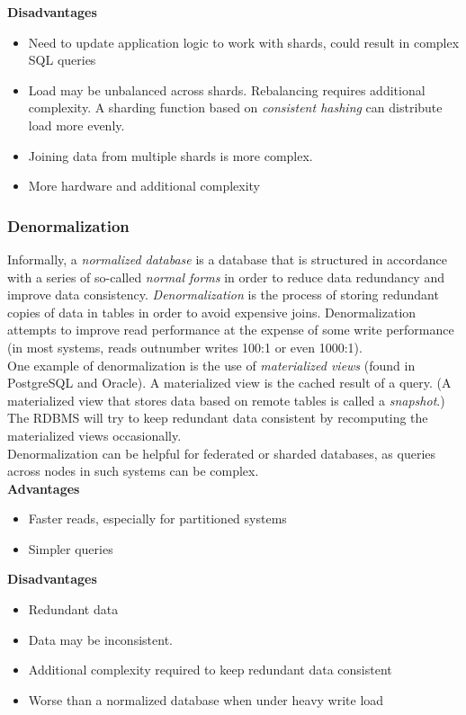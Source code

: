 \documentclass[12pt, titlepage]{article}
\begin{document}
\textbf{Disadvantages}
\begin{itemize}
  \item Need to update application logic to work with shards, could result in complex SQL queries
  \item Load may be unbalanced across shards. Rebalancing requires additional complexity. A sharding function based on \textit{consistent hashing} can distribute load more evenly.
  \item Joining data from multiple shards is more complex.
  \item More hardware and additional complexity
\end{itemize}

\subsubsection{Denormalization}

Informally, a \textit{normalized database} is a database that is structured in accordance with a series of so-called \textit{normal forms} in order to reduce data redundancy and improve data consistency. \textit{Denormalization} is the process of storing redundant copies of data in tables in order to avoid expensive joins. Denormalization attempts to improve read performance at the expense of some write performance (in most systems, reads outnumber writes 100:1 or even 1000:1). \\

One example of denormalization is the use of \textit{materialized views} (found in PostgreSQL and Oracle). A materialized view is the cached result of a query. (A materialized view that stores data based on remote tables is called a \textit{snapshot}.) The RDBMS will try to keep redundant data consistent by recomputing the materialized views occasionally. \\

Denormalization can be helpful for federated or sharded databases, as queries across nodes in such systems can be complex. \\

\textbf{Advantages}
\begin{itemize}
  \item Faster reads, especially for partitioned systems
  \item Simpler queries \\
\end{itemize}

\textbf{Disadvantages}
\begin{itemize}
  \item Redundant data
  \item Data may be inconsistent.
  \item Additional complexity required to keep redundant data consistent
  \item Worse than a normalized database when under heavy write load
\end{itemize}
\end{document}
